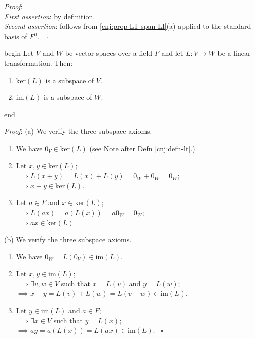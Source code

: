 \documentclass[
  12pt,
  a4paper,
  twoside]{article}
\providecommand{\tightlist}{%
  \setlength{\itemsep}{0pt}\setlength{\parskip}{0pt}}
\theoremstyle{plain}
\theoremstyle{definition}
\begin{document}
\emph{Proof}:\\
\emph{First assertion}: by definition.\\
\emph{Second assertion}: follows from \ref{cnj:prop-LT-span-LI}(a) applied to the standard basis of \(F^{n}\).
\hfill~{\(\square\)}

\csname begin\label{cnj:prop-im-ker-subspaces}
Let \(V\) and \(W\) be vector spaces over a field \(F\) and let \(L: V \to W\) be a linear transformation. Then:

\begin{enumerate}
\def\labelenumi{(\alph{enumi})}
\tightlist
\item
  \(\mathrm{ker}(L)\) is a subspace of \(V\).
\item
  \(\mathrm{im}(L)\) is a subspace of \(W\).
\end{enumerate}

\csname end

\emph{Proof}: (a) We verify the three subspace axioms.

\begin{enumerate}
\def\labelenumi{(\roman{enumi})}
\tightlist
\item
  We have \(0_{V} \in \mathrm{ker}(L)\) (see Note after Defn \ref{cnj:defn-lt}.)
\item
  Let \(x,y \in \mathrm{ker}(L)\);\\
  \(\implies L(x+y) = L(x) + L(y) = 0_{W} + 0_{W} = 0_{W}\);\\
  \(\implies x+y \in \mathrm{ker}(L)\).
\item
  Let \(a \in F\) and \(x \in \mathrm{ker}(L)\);\\
  \(\implies L(ax) = a(L(x)) = a 0_{W} = 0_{W}\);\\
  \(\implies ax \in \mathrm{ker}(L)\).
\end{enumerate}

(b) We verify the three subspace axioms.

\begin{enumerate}
\def\labelenumi{(\roman{enumi})}
\tightlist
\item
  We have \(0_{W} = L(0_{V}) \in \mathrm{im}(L)\).
\item
  Let \(x,y \in \mathrm{im}(L)\);\\
  \(\implies \exists v,w \in V\) such that \(x=L(v)\) and \(y=L(w)\);\\
  \(\implies x+y = L(v) + L(w) = L(v+w) \in \mathrm{im}(L)\).
\item
  Let \(y \in \mathrm{im}(L)\) and \(a \in F\);\\
  \(\implies \exists x \in V\) such that \(y = L(x)\);\\
  \(\implies ay = a(L(x)) = L(ax) \in \mathrm{im}(L)\).
  \hfill~{\(\square\)}
\end{enumerate}
\end{document}
